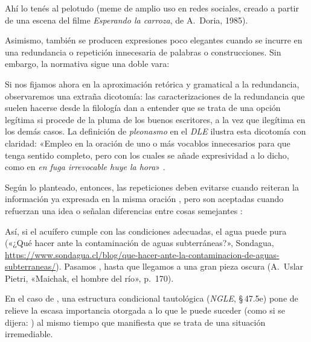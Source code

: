 \begin{exe}
  \ex\label{ex:02-carroza} Ahí lo tenés al pelotudo (meme de amplio uso en redes
      sociales, creado a partir de una escena del filme \textit{Esperando la
      carroza}, de A.~Doria, 1985).
\end{exe}

Asimismo, también se producen expresiones poco elegantes cuando se incurre en
una redundancia o repetición innecesaria de palabras o construcciones. Sin
embargo, la normativa sigue una doble vara:

\begin{cita}
Si nos fijamos ahora en la aproximación retórica y gramatical a la redundancia,
observaremos una extraña dicotomía: las caracterizaciones de la redundancia que
suelen hacerse desde la filología dan a entender que se trata de una opción
legítima si procede de la pluma de los buenos escritores, a la vez que
ilegítima en los demás casos. La definición de \textit{pleonasmo} en el
\textit{DLE} ilustra esta dicotomía con claridad: «Empleo en la oración de uno o
más vocablos innecesarios para que tenga sentido completo, pero con los cuales
se añade expresividad a lo dicho, como en \textit{en fuga irrevocable huye la
hora}» \parencite[30]{bosque2020}.
\end{cita}

Según lo planteado, entonces, las repeticiones deben evitarse cuando reiteran la
información ya expresada en la misma oración , pero son
aceptadas cuando refuerzan una idea o señalan diferencias entre cosas
semejantes :

\begin{exe}
  \ex\label{ex:02-nuevamente} Así, si el acuífero cumple con las condiciones
      adecuadas, el agua puede  pura («¿Qué hacer
      ante la contaminación de aguas subterráneas?», Sondagua,
      \url{https://www.sondagua.cl/blog/que-hacer-ante-la-contaminacion-de-aguas-subterraneas/}).
  \ex\label{ex:02-puertas} Pasamos , hasta que
      llegamos a una gran pieza oscura (A.~Uslar Pietri, «Maichak, el hombre del
      río», p.~170).
\end{exe}

En el caso de , una estructura condicional tautológica
(\textit{NGLE}, §\,47.5e) pone de relieve la escasa importancia otorgada a lo que
le puede suceder (como si se dijera: ) al
mismo tiempo que manifiesta que se trata de una situación irremediable.

